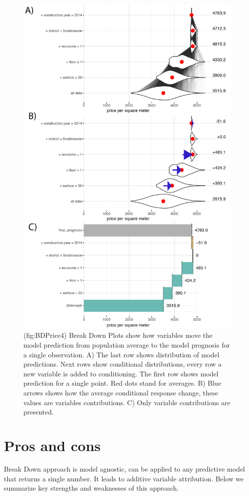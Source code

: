 \documentclass[]{book}
\theoremstyle{definition}
\theoremstyle{definition}
\theoremstyle{definition}
\theoremstyle{remark}
\begin{document}
\begin{figure}

{\centering \includegraphics[width=0.7\linewidth]{figure/bd_price_4} 

}

\caption{(fig:BDPrice4) Break Down Plots show how variables move the model prediction from population average to the model prognosis for a single observation. A) The last row shows distribution of model predictions. Next rows show conditional distributions, every row a new variable is added to conditioning. The first row shows model prediction for a single point. Red dots stand for averages. B) Blue arrows shows how the average conditional response change, these values are variables contributions. C) Only variable contributions are presented. }\label{fig:BDPrice4}
\end{figure}

\hypertarget{pros-and-cons}{%
\section{Pros and cons}\label{pros-and-cons}}

Break Down approach is model agnostic, can be applied to any predictive
model that returns a single number. It leads to additive variable
attribution. Below we summarize key strengths and weaknesses of this
approach.
\end{document}
